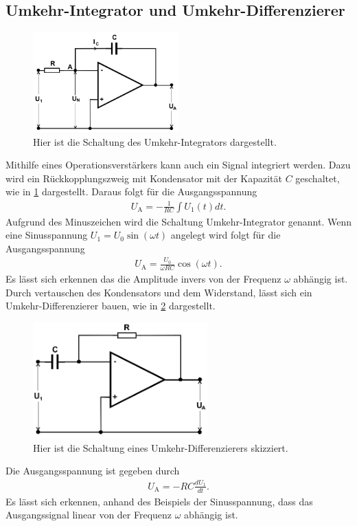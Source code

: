 \subsection{Umkehr-Integrator und Umkehr-Differenzierer}
\begin{figure}[h!]
	\centering
	\includegraphics[width=0.5\textwidth]{../Grafiken/Umkehr_Integrator.png}
	\caption{Hier ist die Schaltung des Umkehr-Integrators dargestellt. \cite{V51} \label{fig:Umkehr_Integrator}}
\end{figure}
Mithilfe eines Operationsverstärkers kann auch ein Signal integriert werden.
Dazu wird ein Rückkopplungszweig mit Kondensator mit der Kapazität $C$ geschaltet, wie in \cref{fig:Umkehr_Integrator} dargestellt.
Daraus folgt für die Ausgangsspannung
\begin{align}
	U_\text{A}=-\frac{1}{RC}\int U_1(t)dt.
\end{align}
Aufgrund des Minuszeichen wird die Schaltung Umkehr-Integrator genannt.
Wenn eine Sinusspannung $U_1=U_0\sin(\omega t)$ angelegt wird folgt für die Ausgangsspannung
\begin{align}
	U_\text{A}=\frac{U_0}{\omega RC}\cos(\omega t).
\end{align}
Es lässt sich erkennen das die Amplitude invers von der Frequenz $\omega$ abhängig ist.
Durch vertauschen des Kondensators und dem Widerstand, lässt sich ein Umkehr-Differenzierer bauen, wie in \cref{fig:Umkehr_Diff} dargestellt.
\begin{figure}[h!]
	\centering
	\includegraphics[width = 0.6\textwidth]{../Grafiken/Umkehr_Differentierer.png}
	\caption{Hier ist die Schaltung eines Umkehr-Differenzierers skizziert. \cite{V51}\label{fig:Umkehr_Diff}}
\end{figure}
Die Ausgangsspannung ist gegeben durch
\begin{align}
	U_\text{A}=-RC\frac{dU_1}{dt}.
\end{align}
Es lässt sich erkennen, anhand des Beispiels der Sinusspannung, dass das Ausgangssignal linear von der Frequenz $\omega$ abhängig ist.
